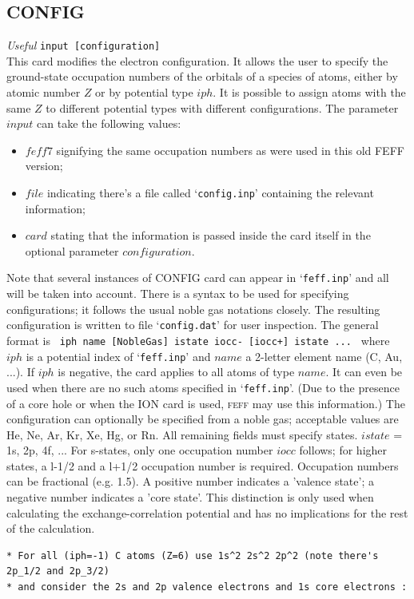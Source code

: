 \documentclass[11pt,oneside]{report} %
\newcommand{\program}[1]{\textsc{#1}}
\newcommand{\feff}{\program{feff}}
\newenvironment{Card}[4]%
      {\vspace{3ex}%
        \subsection{#1}
        \quad\textsl{#3}\newline
        \quad\texttt{#2}\newline%
        \label{card:#4}\\}
      {}
\newcommand{\file}[1]{`\texttt{#1}'}
\begin{document}
\begin{Card}{CONFIG}{input [configuration]}{Useful}{cfg}
  This card modifies the electron configuration.  It allows the user to specify the ground-state occupation numbers of the orbitals of 
  a species of atoms, either by atomic number $Z$ or by potential type $iph$.  It is possible to assign atoms with the same $Z$ to different potential types with different configurations. 
  The parameter $input$ can take the following values: 
 \begin{itemize}
    \tightlist  
  \item $feff7$ signifying the same occupation numbers as were used in this old FEFF version;
  \item $file$ indicating there's a file called \file{config.inp} containing the relevant information;
  \item $card$ stating that the information is passed inside the card itself in the optional parameter $configuration$.
  \end{itemize}
  Note that several instances of CONFIG card can appear in \file{feff.inp} and all will be taken into account.
  There is a syntax to be used for specifying configurations; it follows the usual noble gas notations closely.  The resulting configuration
  is written to file \file{config.dat} for user inspection.  The general format is
  \texttt{ iph name [NobleGas] istate iocc- [iocc+] istate ... }
  where $iph$ is a potential index of \file{feff.inp} and $name$ a 2-letter element name (C, Au, ...).  If $iph$ is negative, the card applies to all
  atoms of type $name$.  It can even be used when there are no such atoms specified in \file{feff.inp}.  (Due to the presence of a core hole or when the ION card is used, {\feff} may use this information.)  The configuration can optionally be specified from
  a noble gas; acceptable values are He, Ne, Ar, Kr, Xe, Hg, or Rn.  All remaining fields must specify states.  $istate$ = 1s, 2p, 4f, ...  For s-states, only one 
  occupation number $iocc$ follows; for higher states, a l-1/2 and a l+1/2 occupation number is required.  Occupation numbers can be fractional (e.g. 1.5).  A positive
  number indicates a 'valence state'; a negative number indicates a 'core state'.  This distinction is only used when calculating the exchange-correlation potential and has no implications for the rest of the calculation.
\begin{verbatim}
* For all (iph=-1) C atoms (Z=6) use 1s^2 2s^2 2p^2 (note there's 2p_1/2 and 2p_3/2) 
* and consider the 2s and 2p valence electrons and 1s core electrons :

\end{verbatim}
\end{Card}
\end{document}
